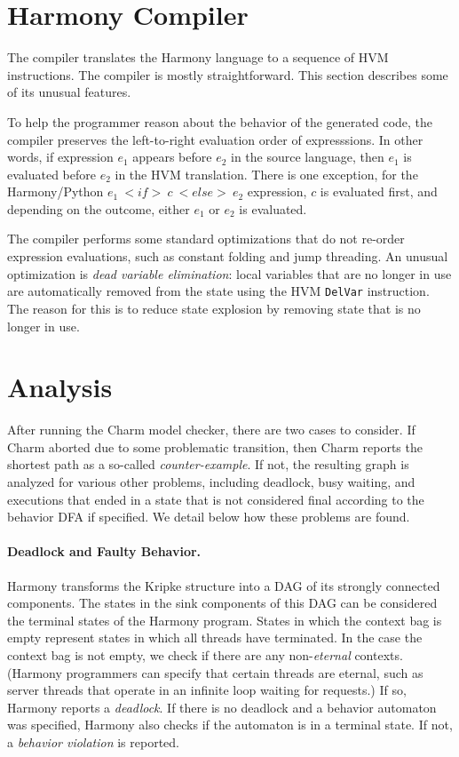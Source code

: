 \documentclass[twocolumn]{article}
\begin{document}
\section{Harmony Compiler}

The compiler translates the Harmony language to a sequence of HVM
instructions.  The compiler is mostly straightforward.  This section
describes some of its unusual features.

To help the programmer reason about the behavior of the generated code,
the compiler preserves the left-to-right evaluation order of
expresssions.  In other words, if expression $e_1$ appears before
$e_2$ in the source language, then $e_1$ is evaluated before $e_2$
in the HVM translation.  There is one exception, for the Harmony/Python
$e_1~<{if}>~c~<{else}>~e_2$ expression, $c$ is evaluated first, and
depending on the outcome, either $e_1$ or $e_2$ is evaluated.

The compiler performs some standard optimizations that do not re-order
expression evaluations, such as constant folding and jump threading.
An unusual optimization is \emph{dead variable elimination}:
local variables that are no longer in use are automatically removed
from the state using the HVM \texttt{DelVar} instruction.  The reason
for this is to reduce state explosion by removing state that is no
longer in use.

\section{Analysis}

After running the Charm model checker, there are two cases to
consider.  If Charm aborted due to some problematic transition,
then Charm reports the shortest path as a so-called \emph{counter-example}.
If not, the resulting graph is analyzed for various other problems,
including deadlock, busy waiting, and executions
that ended in a state that is not considered final according to the
behavior DFA if specified.  We detail below how these problems are
found.

\paragraph{Deadlock and Faulty Behavior.}

Harmony transforms the Kripke structure into a DAG of its strongly
connected components.  The states in the sink components of this
DAG can be considered the terminal states of the Harmony program.
States in which the context bag is empty represent states in which
all threads have terminated.  In the case the context bag is not
empty, we check if there are any non-\emph{eternal} contexts.
(Harmony programmers can
specify that certain threads are eternal, such as server threads
that operate in an infinite loop waiting for requests.) If
so, Harmony reports a \emph{deadlock}. If there
is no deadlock and a behavior automaton was specified, Harmony also
checks if the automaton is in a terminal state.  If not, a
\emph{behavior violation} is reported.
\end{document}
